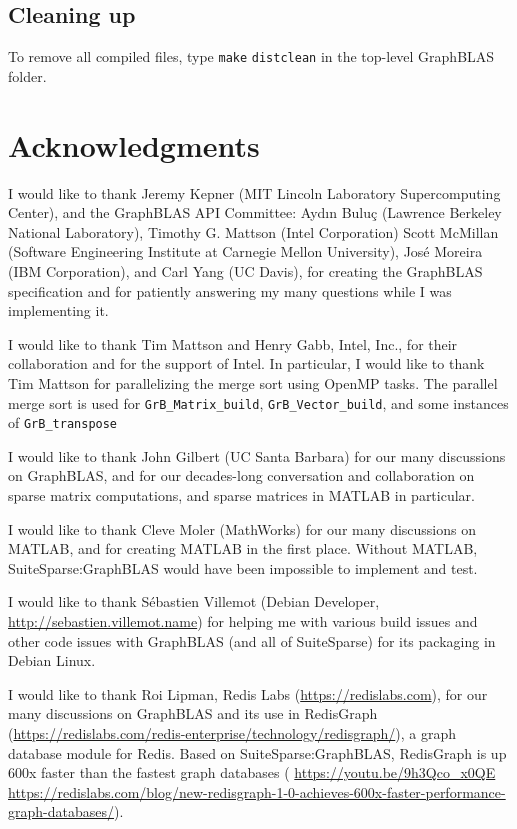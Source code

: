 \documentclass[12pt]{article}
\begin{document}
\subsection{Cleaning up}

To remove all compiled files, type \verb'make' \verb'distclean' in the top-level
GraphBLAS folder.

\newpage
\section{Acknowledgments}

I would like to thank Jeremy Kepner (MIT Lincoln Laboratory Supercomputing
Center), and the GraphBLAS API Committee: Ayd\i n Bulu\c{c} (Lawrence Berkeley
National Laboratory), Timothy G. Mattson (Intel Corporation) Scott McMillan
(Software Engineering Institute at Carnegie Mellon University), Jos\'e Moreira
(IBM Corporation), and Carl Yang (UC Davis), for creating the GraphBLAS
specification and for patiently answering my many questions while I was
implementing it.

I would like to thank Tim Mattson and Henry Gabb, Intel, Inc., for their
collaboration and for the support of Intel.  In particular, I would like to
thank Tim Mattson for parallelizing the merge sort using OpenMP tasks.  The
parallel merge sort is used for \verb'GrB_Matrix_build',
\verb'GrB_Vector_build', and some instances of \verb'GrB_transpose'

I would like to thank John Gilbert (UC Santa Barbara) for our many discussions
on GraphBLAS, and for our decades-long conversation and collaboration on sparse
matrix computations, and sparse matrices in MATLAB in particular.

I would like to thank Cleve Moler (MathWorks) for our many discussions on
MATLAB, and for creating MATLAB in the first place.  Without MATLAB,
SuiteSparse:GraphBLAS would have been impossible to implement and test.

I would like to thank S\'ebastien Villemot (Debian Developer,
\url{http://sebastien.villemot.name}) for helping me with various build issues
and other code issues with GraphBLAS (and all of SuiteSparse) for its packaging
in Debian Linux.

I would like to thank Roi Lipman, Redis Labs (\url{https://redislabs.com}), for
our many discussions on GraphBLAS and its use in RedisGraph
(\url{https://redislabs.com/redis-enterprise/technology/redisgraph/}), a graph
database module for Redis.  Based on SuiteSparse:GraphBLAS, RedisGraph is up
600x faster than the fastest graph databases ({\footnotesize
\url{https://youtu.be/9h3Qco_x0QE} \newline
\url{https://redislabs.com/blog/new-redisgraph-1-0-achieves-600x-faster-performance-graph-databases/}}).
\end{document}
